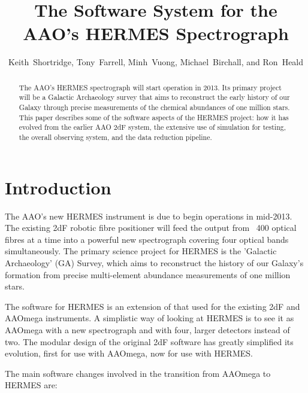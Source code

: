
\resetcounters





\title{The Software System for the AAO's HERMES Spectrograph}
\author{Keith~Shortridge, Tony~Farrell, Minh~Vuong, Michael~Birchall, and Ron~Heald
}


\begin{abstract}
The AAO's HERMES spectrograph will start operation in 2013. Its primary project will be a Galactic Archaeology survey that aims to reconstruct the early history of our Galaxy through precise measurements of the chemical abundances of one million stars. This paper describes some of the software aspects of the HERMES project: how it has evolved from the earlier AAO 2dF system, the extensive use of simulation for testing, the overall observing system, and the data reduction pipeline.
\end{abstract}

\section{Introduction}

The AAO's new HERMES instrument \citep{Hermes_2010} is due to begin operations in mid-2013. The existing 2dF robotic fibre positioner will feed the output from ~400 optical fibres at a time into a powerful new spectrograph covering four optical bands simultaneously. The primary science project for HERMES is the 'Galactic Archaeology' (GA) Survey, which aims to reconstruct the history of our Galaxy's formation from precise multi-element abundance measurements of one million stars.

The software for HERMES is an extension of that used for the existing 2dF and AAOmega instruments. A simplistic way of looking at HERMES is to see it as AAOmega with a new spectrograph and with four, larger detectors instead of two. The modular design of the original 2dF software has greatly simplified its evolution, first for use with AAOmega, now for use with HERMES.

The main software changes involved in the transition from AAOmega to HERMES are:

